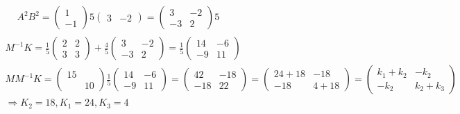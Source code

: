 \documentclass[twoside,10pt]{amsart}
\begin{document}
\begin{enumerate}
\[\begin{gathered}
\begin{aligned}
  & A^2 B^2 = \left( \begin{matrix} 1 \\ -1 \end{matrix} \right) 5 \left( \begin{matrix} 3 & -2 \end{matrix} \right) = \left( \begin{matrix} 3 & -2 \\ -3 & 2 \end{matrix} \right) 5 
\end{aligned}  \\
M^{-1}K = \frac{1}{5}  \left( \begin{matrix} 2 & 2 \\ 3 & 3 \end{matrix} \right) + \frac{4}{5}  \left( \begin{matrix} 3 & -2 \\ -3 & 2 \end{matrix} \right) = \frac{1}{5} \left( \begin{matrix} 14 & -6 \\ -9 & 11 \end{matrix} \right) \\
MM^{-1}K = \left( \begin{matrix} 15 & \\ & 10 \end{matrix} \right) \frac{1}{5} \left(  \begin{matrix} 14 & -6 \\ -9 & 11 \end{matrix} \right)  = \left( \begin{matrix} 42 & -18 \\ -18 & 22 \end{matrix} \right) = \left( \begin{matrix} 24 + 18 & -18 \\ -18 & 4 + 18 \end{matrix} \right) = \left( \begin{matrix} k_1 + k_2 & -k_2 \\ -k_2 & k_2 +k_3 \end{matrix} \right)  \\
\Longrightarrow \boxed{ K_2 = 18, K_1 = 24, K_3 = 4 }
\end{gathered}
\]
\end{enumerate}
\end{document}
